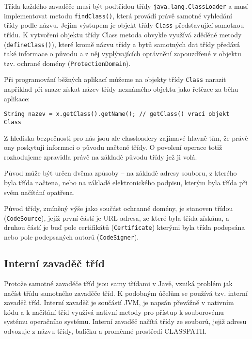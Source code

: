 Třída každého zavaděče musí být podtřídou třídy {\tt java.lang.ClassLoader} a musí implementovat metodu {\tt findClass()}, která provádí právě samotné vyhledání třídy podle názvu. Jejím výstupem je objekt třídy {\tt Class} představující samotnou třídu. K vytvoření objektu třídy Class metoda obvykle využívá zděděné metody ({\tt defineClass()}), které kromě názvu třídy a bytů samotných dat třídy předává také informace o původu a z něj vyplývajících oprávnění zapouzdřené v objektu tzv. ochrané domény ({\tt ProtectionDomain}). \cite{refClassLoader}

Při programování běžných aplikací můžeme na objekty třídy {\tt Class} narazit například při snaze získat název třídy neznámého objektu jako řetězec za běhu aplikace:

\begin{verbatim}
String nazev = x.getClass().getName(); // getClass() vrací objekt Class
\end{verbatim}

Z hlediska bezpečnosti pro nás jsou ale classloadery zajímavé hlavně tím, že právě ony poskytují informaci o původu načtené třídy. O povolení operace totiž rozhodujeme zpravidla právě na základě původu třídy jež ji volá.

Původ může být určen dvěma způsoby -- na základě adresy souboru, z kterého byla třída načtena, nebo na základě elektronického podpisu, kterým byla třída při svém načítání opatřena.

Původ třídy, zmíněný výše jako součást ochranné domény, je stanoven třídou ({\tt CodeSource}), jejíž první částí je URL adresa, ze které byla třída získána, a druhou částí je buď pole certifikátů ({\tt Certificate}) kterými byla třída podepsána nebo pole podepsaných autorů ({\tt CodeSigner}). \cite{refClassLoader}

\subsection{Interní zavaděč tříd}

Protože samotné zavaděče tříd jsou samy třídami v Javě, vzniká problém jak načíst třídu samotného zavaděče tříd. K podobným účelům se používá tzv. interní zavaděč tříd. Interní zavaděč je součástí JVM, je napsán převážně v nativním kódu a k načítání tříd využívá nativní metody pro přístup k souborovému systému operačního systému. Interní zavaděč načítá třídy ze souborů, jejiž adresu odvozuje z názvu třídy, balíčku a proměnné prostředí CLASSPATH. \cite[3.2.1]{oaks}

